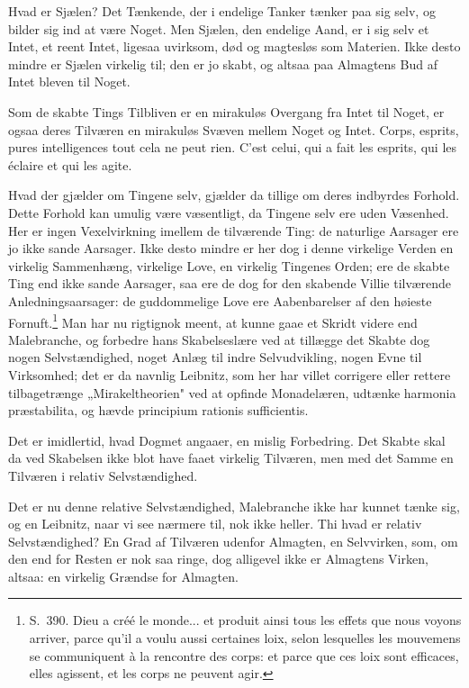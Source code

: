 \documentclass[12pt,a4paper]{article}
\newcommand{\opage}[1]{\marginnote{\footnotesize\textit{[#1]}}}
\begin{document}
Hvad er Sjælen? Det Tænkende, der i endelige Tanker tænker paa sig selv, og
bilder sig ind at være Noget. Men Sjælen, den endelige Aand, er i sig selv et
Intet, et reent Intet, ligesaa uvirksom, død og magtesløs som Materien. Ikke
desto mindre er Sjælen virkelig til; den er jo skabt, og altsaa paa Almagtens
Bud af Intet bleven til Noget.

Som de skabte Tings Tilbliven er en mirakuløs Overgang fra Intet til Noget, er
ogsaa deres Tilværen en mirakuløs Svæven mellem Noget og Intet. Corps, esprits,
pures intelligences tout cela ne peut rien. C'est celui, qui a fait les esprits,
qui les éclaire et qui les agite.

Hvad der gjælder om Tingene selv, gjælder da tillige om deres indbyrdes Forhold.
Dette Forhold kan umulig være væsentligt, da Tingene selv ere uden Væsenhed. Her
er ingen Vexelvirkning imellem de tilværende Ting: de naturlige Aarsager ere jo
ikke sande Aarsager. Ikke desto mindre er her dog i denne virkelige Verden en
virkelig Sammenhæng, virkelige Love, en virkelig Tingenes Orden; ere de skabte
Ting end ikke sande Aarsager, saa ere de dog for den skabende Villie tilværende
Anledningsaarsager: de guddommelige Love ere Aabenbarelser af den høieste
Fornuft.\footnote{S.~390. Dieu a créé le monde... et produit ainsi tous les
effets que nous voyons arriver, parce qu'il a voulu aussi certaines loix, selon
lesquelles les mouvemens se communiquent à la rencontre des corps: et parce que
ces loix sont efficaces, elles agissent, et les corps ne peuvent agir.}
\opage{25} Man har nu rigtignok meent, at kunne gaae et Skridt videre end Malebranche, og
forbedre hans Skabelseslære ved at tillægge det Skabte dog nogen Selvstændighed,
noget Anlæg til indre Selvudvikling, nogen Evne til Virksomhed; det er da navnlig
Leibnitz, som her har villet corrigere eller rettere tilbagetrænge
„Mirakeltheorien" ved at opfinde Monadelæren, udtænke harmonia præstabilita, og
hævde principium rationis sufficientis.

Det er imidlertid, hvad Dogmet angaaer, en mislig Forbedring. Det Skabte skal da
ved Skabelsen ikke blot have faaet virkelig Tilværen, men med det Samme en
Tilværen i relativ Selvstændighed.

Det er nu denne relative Selvstændighed, Malebranche ikke har kunnet tænke sig,
og en Leibnitz, naar vi see nærmere til, nok ikke heller. Thi hvad er relativ
Selvstændighed? En Grad af Tilværen udenfor Almagten, en Selvvirken, som, om den
end for Resten er nok saa ringe, dog alligevel ikke er Almagtens Virken, altsaa:
en virkelig Grændse for Almagten.
\end{document}
